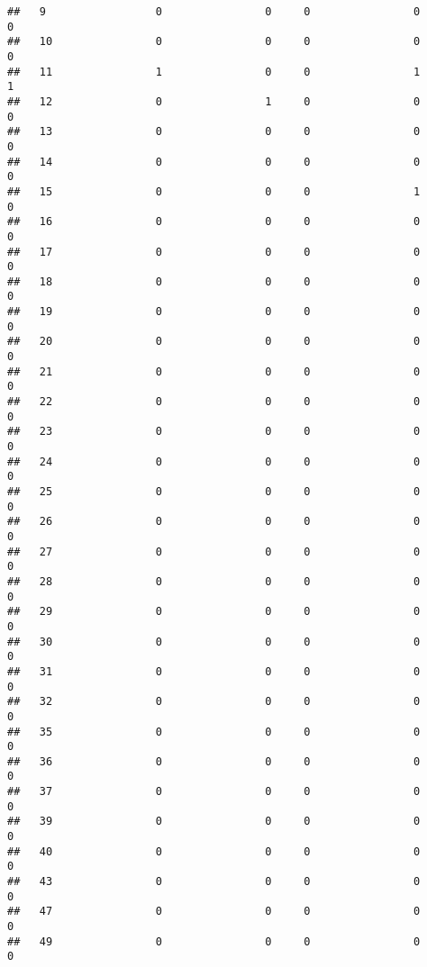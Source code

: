 \documentclass[]{article}
\begin{document}
\begin{verbatim}
##   9                 0                0     0                0                0
##   10                0                0     0                0                0
##   11                1                0     0                1                1
##   12                0                1     0                0                0
##   13                0                0     0                0                0
##   14                0                0     0                0                0
##   15                0                0     0                1                0
##   16                0                0     0                0                0
##   17                0                0     0                0                0
##   18                0                0     0                0                0
##   19                0                0     0                0                0
##   20                0                0     0                0                0
##   21                0                0     0                0                0
##   22                0                0     0                0                0
##   23                0                0     0                0                0
##   24                0                0     0                0                0
##   25                0                0     0                0                0
##   26                0                0     0                0                0
##   27                0                0     0                0                0
##   28                0                0     0                0                0
##   29                0                0     0                0                0
##   30                0                0     0                0                0
##   31                0                0     0                0                0
##   32                0                0     0                0                0
##   35                0                0     0                0                0
##   36                0                0     0                0                0
##   37                0                0     0                0                0
##   39                0                0     0                0                0
##   40                0                0     0                0                0
##   43                0                0     0                0                0
##   47                0                0     0                0                0
##   49                0                0     0                0                0

\end{verbatim}
\end{document}
